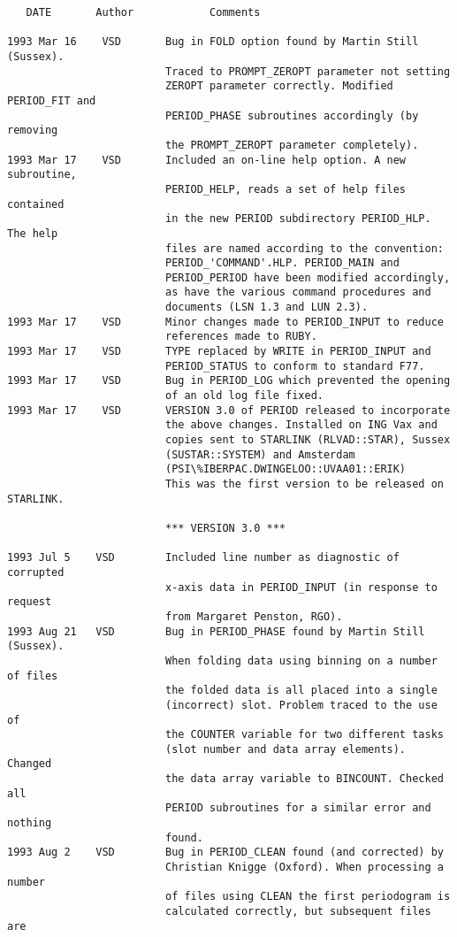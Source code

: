 \newpage


\begin{verbatim}
   DATE       Author            Comments                           
                                                      
1993 Mar 16    VSD       Bug in FOLD option found by Martin Still (Sussex).
                         Traced to PROMPT_ZEROPT parameter not setting 
                         ZEROPT parameter correctly. Modified PERIOD_FIT and 
                         PERIOD_PHASE subroutines accordingly (by removing
                         the PROMPT_ZEROPT parameter completely).
1993 Mar 17    VSD       Included an on-line help option. A new subroutine, 
                         PERIOD_HELP, reads a set of help files contained
                         in the new PERIOD subdirectory PERIOD_HLP. The help
                         files are named according to the convention:
                         PERIOD_'COMMAND'.HLP. PERIOD_MAIN and
                         PERIOD_PERIOD have been modified accordingly,
                         as have the various command procedures and 
                         documents (LSN 1.3 and LUN 2.3).
1993 Mar 17    VSD       Minor changes made to PERIOD_INPUT to reduce
                         references made to RUBY. 
1993 Mar 17    VSD       TYPE replaced by WRITE in PERIOD_INPUT and
                         PERIOD_STATUS to conform to standard F77.
1993 Mar 17    VSD       Bug in PERIOD_LOG which prevented the opening
                         of an old log file fixed.
1993 Mar 17    VSD       VERSION 3.0 of PERIOD released to incorporate
                         the above changes. Installed on ING Vax and
                         copies sent to STARLINK (RLVAD::STAR), Sussex 
                         (SUSTAR::SYSTEM) and Amsterdam 
                         (PSI\%IBERPAC.DWINGELOO::UVAA01::ERIK)
                         This was the first version to be released on STARLINK.
	                   
                         *** VERSION 3.0 *** 
	                   
1993 Jul 5    VSD        Included line number as diagnostic of corrupted
                         x-axis data in PERIOD_INPUT (in response to request
                         from Margaret Penston, RGO). 
1993 Aug 21   VSD        Bug in PERIOD_PHASE found by Martin Still (Sussex).
                         When folding data using binning on a number of files
                         the folded data is all placed into a single
                         (incorrect) slot. Problem traced to the use of 
                         the COUNTER variable for two different tasks 
                         (slot number and data array elements). Changed 
                         the data array variable to BINCOUNT. Checked all
                         PERIOD subroutines for a similar error and nothing
                         found.
1993 Aug 2    VSD        Bug in PERIOD_CLEAN found (and corrected) by 
                         Christian Knigge (Oxford). When processing a number
                         of files using CLEAN the first periodogram is
                         calculated correctly, but subsequent files are 
                          

\end{verbatim}

